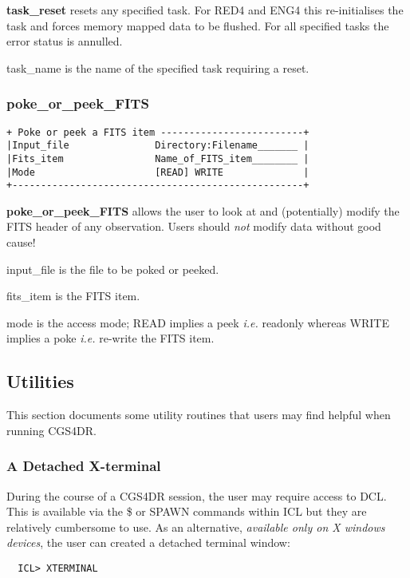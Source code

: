 {{\bf task\_reset} resets any specified task. For RED4 and ENG4 this 
re-initialises the task and forces memory mapped data to be flushed. For all
specified tasks the error status is annulled.

{\sf task\_name} is the name of the specified task requiring a reset.

\subsubsection{poke\_or\_peek\_FITS}
\begin{verbatim}
+ Poke or peek a FITS item -------------------------+
|Input_file               Directory:Filename_______ |
|Fits_item                Name_of_FITS_item________ |
|Mode                     [READ] WRITE              |
+---------------------------------------------------+
\end{verbatim}

{\bf poke\_or\_peek\_FITS} allows the user to look at and (potentially) modify
the FITS header of any observation. Users should {\em not} modify data without
good cause!

{\sf input\_file} is the file to be poked or peeked.

{\sf fits\_item} is the FITS item. 

{\sf mode} is the access mode; READ implies a peek {\em i.e.} readonly whereas
WRITE implies a poke {\em i.e.} re-write the FITS item.

\subsection{Utilities}
\label{utilities}

This section documents some utility routines that users may find helpful when
running CGS4DR.

\subsubsection{A Detached X-terminal}
\label{a_detached_xterminal}

During the course of a CGS4DR session, the user may require access to
DCL. This is available via the {\sf \$} or {\sf SPAWN} commands within
ICL but they are relatively cumbersome to use. As an alternative, 
{\em available only on X windows devices}, the user can created a detached 
terminal window:

\begin{verbatim}
  ICL> XTERMINAL
\end{verbatim}

}

